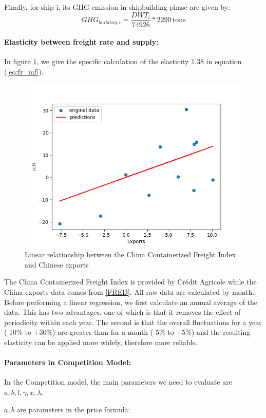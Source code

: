 \documentclass[a4paper,12pt]{article}
\begin{document}
Finally, for ship i, its GHG emission in shipbuilding phase are given by:
\begin{equation}
	GHG_{building,i} = \dfrac{DWT_i}{74926} * 2290 \, \text{tons}
	\label{eq:shipbuilding}
\end{equation}

\paragraph{Elasticity between freight rate and supply:}
In figure \ref{fig:elasticity}, we give the specific calculation of the elasticity 1.38 in equation (\ref{eq:fr_mf}).\\

\begin{figure}[htbp]
	\centering
	\includegraphics[width=0.5\linewidth]{report-fig/Elasticity.png}
	\caption{Linear relationship between the China Containerized Freight Index and Chinese exports}
	\label{fig:elasticity}
\end{figure}

The China Containerized Freight Index is provided by Crédit Agricole while the China exports data comes from \href{https://fred.stlouisfed.org/series/XTEXVA01CNM667S}{[FRED]}.
All raw data are calculated by month.
Before performing a linear regression, we first calculate an annual average of the data.
This has two advantages, one of which is that it removes the effect of periodicity within each year.
The second is that the overall fluctuations for a year (-10\% to +30\%) are greater than for a month (-5\% to +5\%) and the resulting elasticity can be applied more widely, therefore more reliable.

\paragraph{Parameters in Competition Model:} In the Competition model, the main parameters we need to evaluate are $a, b, l, \gamma, x, \lambda$.

$a,b$ are parameters in the price formula:
\end{document}
